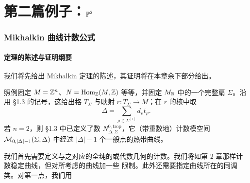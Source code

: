 
\part{第二篇\quad 例子：$\mathbb{P}^2$}

\section{Mikhalkin 曲线计数公式}

\subsection{定理的陈述与证明纲要}
我们将先给出 Mikhalkin 定理的陈述，其证明将在本章余下部分给出。

照例固定 $M = \mathbb{Z}^n$、$N = \operatorname{Hom}_{\mathbb{Z}}(M,\mathbb{Z})$ 等等，并固定 $M_{\mathbb{R}}$ 中的一个完整扇 $\Sigma$。沿用 §1.3
的记号，这给出格 $T_\Sigma$ 与映射 $r : T_\Sigma \to M$；在 $r$ 的核中取
\[
\Delta = \sum_{\rho\in\Sigma^{[1]}} d_\rho t_\rho.
\]
若 $n = 2$，则 §1.3 中已定义了数 $N^{0,\mathrm{trop}}_{\Delta,\Sigma}$，它（带重数地）计数模空间
$\mathcal{M}_{0,|\Delta|-1}(\Sigma,\Delta)$ 中经过 $|\Delta|-1$ 个一般点的热带曲线。

我们首先需要定义与之对应的全纯的或代数几何的计数。我们将如第 2 章那样计数稳定曲线，但对所考虑的曲线加一些
限制。此外还需要指定曲线所在的同调类。对第一点，我们用

